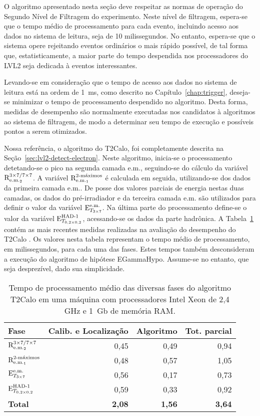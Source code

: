 O algoritmo apresentado nesta seção deve respeitar as normas de operação do
Segundo Nível de Filtragem do experimento. Neste nível de filtragem, espera-se
que o tempo médio de processamento para cada evento, incluindo acesso aos
dados no sistema de leitura, seja de 10 milissegundos. No entanto, espera-se
que o sistema opere rejeitando eventos ordinários o mais rápido possível, de
tal forma que, estatisticamente, a maior parte do tempo despendida nos
processadores do LVL2 seja dedicada à eventos interessantes.

Levando-se em consideração que o tempo de acesso aos dados no sistema de
leitura está na ordem de 1~ms, como descrito no Capítulo~\ref{chap:trigger},
deseja-se minimizar o tempo de processamento despendido no algoritmo. Desta
forma, medidas de desempenho são normalmente executadas nos candidatos à
algoritmos ao sistema de filtragem, de modo a determinar seu tempo de execução
e possíveis pontos a serem otimizados.

Nossa referência, o algoritmo do T2Calo, foi completamente descrita na
Seção~\ref{sec:lvl2-detect-electron}. Neste algoritmo, inicia-se o
processamento detetando-se o pico na segunda camada e.m., seguindo-se do
cálculo da variável $\rcore$. A variável $\eratio$ é calculada em seguida,
utilizando-se dos dados da primeira camada e.m.. De posse dos valores parciais
de energia nestas duas camadas, os dados do pré-irradiador e da terceira
camada e.m. são utilizados para definir o valor da variável $\etem$. Na última
parte do processamento define-se o valor da variável $\ethad$, acessando-se os
dados da parte hadrônica. A Tabela~\ref{tab:t2calo-performance} contém as mais
recentes medidas realizadas na avaliação do desempenho do T2Calo
\cite{denis-presentation}. Os valores nesta tabela representam o tempo médio
de processamento, em milissegundos, para cada uma das fases. Estes tempos
também desconsideram a execução do algoritmo de hipótese EGammaHypo. Assume-se
no entanto, que seja desprezível, dado sua simplicidade.

\begin{table}
\begin{center}
\begin{tabular}{|l|r|r|r|} \hline
\textbf{Fase} & \textbf{Calib. e Localização} & 
\textbf{Algoritmo} & \textbf{Tot. parcial}\\ \hline
$\rcore$ & 0,45 & 0,49 & 0,94 \\ 
$\eratio$ & 0,48 & 0,57 & 1,05 \\ 
$\etem$ & 0,56 & 0,17 & 0,73 \\ 
$\ethad$ & 0,59 & 0,33 & 0,92 \\ \hline
\textbf{Total} & \textbf{2,08} & \textbf{1,56} & \textbf{3,64} \\ \hline
\end{tabular}
\end{center}
\caption{Tempo de processamento médio das diversas fases do algoritmo T2Calo
em uma máquina com processadores Intel Xeon de 2,4 GHz e 1~Gb de memória RAM.}
\label{tab:t2calo-performance}
\end{table}

